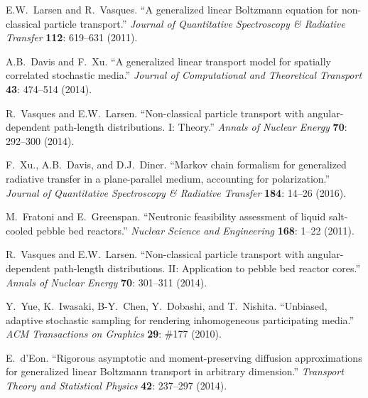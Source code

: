 \documentclass[12pt]{article}
\begin{document}
\begin{thebibliography}{10}

E.W.~Larsen and R.~Vasques.
``A generalized linear Boltzmann equation for non-classical particle transport.''
\textit{Journal of Quantitative Spectroscopy \& Radiative Transfer} \textbf{112}: 619--631 (2011).\vspace{-5pt}

A.B.~Davis and F.~Xu.
``A generalized linear transport model for spatially correlated stochastic media.''
\textit{Journal of Computational and Theoretical Transport} \textbf{43}: 474--514 (2014).\vspace{-5pt}

R.~Vasques and E.W.~Larsen.
``Non-classical particle transport with angular-dependent path-length distributions. I: Theory.''
\textit{Annals of Nuclear Energy} \textbf{70}: 292--300 (2014).\vspace{-5pt}

F.~Xu., A.B.~Davis, and D.J.~Diner.
``Markov chain formalism for generalized radiative transfer in a plane-parallel medium, accounting for polarization.''
\textit{Journal of Quantitative Spectroscopy \& Radiative Transfer} \textbf{184}: 14--26 (2016).\vspace{-5pt}

M.~Fratoni and E.~Greenspan.
``Neutronic feasibility assessment of liquid salt-cooled pebble bed reactors.''
\textit{Nuclear Science and Engineering} \textbf{168}: 1--22 (2011). \vspace{-5pt}

R.~Vasques and E.W.~Larsen.
``Non-classical particle transport with angular-dependent path-length distributions. II: Application to pebble bed reactor cores.''
\textit{Annals of Nuclear Energy} \textbf{70}: 301--311 (2014). \vspace{-5pt}

Y.~Yue, K.~Iwasaki, B-Y.~Chen, Y.~Dobashi, and T.~Nishita.
``Unbiased, adaptive stochastic sampling for rendering inhomogeneous participating media.''
\textit{ACM Transactions on Graphics} \textbf{29}: \#177 (2010).\vspace{-5pt}

E.~d'Eon.
``Rigorous asymptotic and moment-preserving diffusion approximations for generalized linear Boltzmann transport in arbitrary dimension.''
\textit{Transport Theory and Statistical Physics} \textbf{42}: 237--297 (2014).\vspace{-5pt}


\end{thebibliography}
\end{document}
